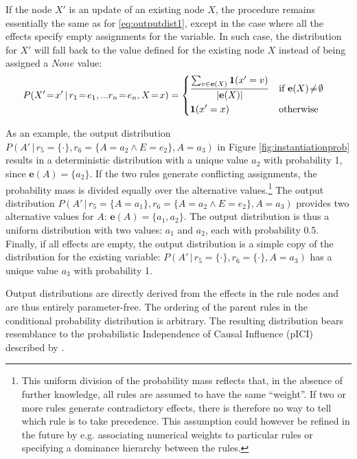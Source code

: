 If the node $X'$ is an update of an existing node $X$, the procedure remains essentially the same as for \eqref{eq:outputdist1}, except in the case where all the effects specify empty assignments for the variable. In such case, the distribution for $X'$ will fall back to the value defined for the existing node $X$ instead of being assigned a $\mathit{None}$ value:
\begin{align}
&P(X'\!=\!x' \, | \, r_1\!=\!e_1,... r_n\!=\!e_n, X\!=\!x) = \begin{dcases} 
\frac{\sum_{v \in {\mathbf{e}(X)}} \mathbf{1}(x' = v)} { |\mathbf{e}(X)| }  & \text{if } \mathbf{e}(X)\!\neq\!\emptyset \\
\mathbf{1}(x' = x) & \text{otherwise}
\end{dcases}\label{eq:outputdist2}
\end{align}

As an example, the output distribution $P(A' \, | \, r_5\!=\!\{\cdot\},r_6\!=\!\{A\!=\!a_2 \land E\!=\!e_2\}, A\!=\!a_3)$ in Figure \ref{fig:instantiationprob} results in a deterministic distribution with a unique value $a_2$ with probability 1, since $\mathbf{e}(A) = \{a_2\}$. If the two rules generate conflicting assignments, the probability mass is divided equally over the alternative values.\footnote{This uniform division of the probability mass reflects that, in the absence of further knowledge, all rules are assumed to have the same ``weight''. If two or more rules generate contradictory effects, there is therefore no way to tell which rule is to take precedence. This assumption could however be refined in the future by e.g. associating numerical weights to particular rules or specifying a dominance hierarchy between the rules.}   The output distribution $P(A' \, | \, r_5\!=\!\{A\!=\!a_1\},r_6\!=\!\{A\!=\!a_2 \land E\!=\!e_2\}, A\!=\!a_3)$ provides two alternative values for $A$: $\mathbf{e}(A) = \{a_1,a_2\}$. The output distribution is thus a uniform distribution with two values: $a_1$ and $a_2$, each with probability 0.5. Finally, if all effects are empty, the output distribution is a simple copy of the distribution for the existing variable: $P(A' \, | \, r_5\!=\!\{\cdot\},r_6\!=\!\{\cdot\}, A\!=\!a_3)$ has a unique value $a_3$ with probability 1. 

Output distributions are directly derived from the effects in the rule nodes and are thus entirely parameter-free.  The ordering of the parent rules in the conditional probability distribution is arbitrary. The resulting distribution bears resemblance to the probabilistic Independence of Causal Influence (pICI) described by \cite{diez06}. 


